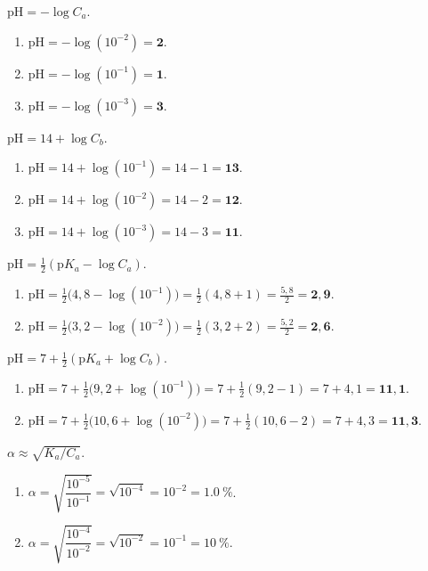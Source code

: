 \documentclass[11pt,a4paper]{article}
\begin{document}

\begin{corrige}
$\mathrm{pH} = -\log C_a$.
\begin{enumerate}[label=\alph*)]
  \item $\mathrm{pH} = -\log(10^{-2}) = \mathbf{2}$.
  \item $\mathrm{pH} = -\log(10^{-1}) = \mathbf{1}$.
  \item $\mathrm{pH} = -\log(10^{-3}) = \mathbf{3}$.
\end{enumerate}
\end{corrige}

\begin{corrige}
$\mathrm{pH} = 14 + \log C_b$.
\begin{enumerate}[label=\alph*)]
  \item $\mathrm{pH} = 14 + \log(10^{-1}) = 14 - 1 = \mathbf{13}$.
  \item $\mathrm{pH} = 14 + \log(10^{-2}) = 14 - 2 = \mathbf{12}$.
  \item $\mathrm{pH} = 14 + \log(10^{-3}) = 14 - 3 = \mathbf{11}$.
\end{enumerate}
\end{corrige}

\begin{corrige}
$\mathrm{pH} = \tfrac12(\mathrm{p}K_a - \log C_a)$.
\begin{enumerate}[label=\alph*)]
  \item $\mathrm{pH} = \tfrac12\bigl(4{,}8 - \log(10^{-1})\bigr) = \tfrac12(4{,}8 + 1) = \tfrac{5{,}8}{2} = \mathbf{2{,}9}$.
  \item $\mathrm{pH} = \tfrac12\bigl(3{,}2 - \log(10^{-2})\bigr) = \tfrac12(3{,}2 + 2) = \tfrac{5{,}2}{2} = \mathbf{2{,}6}$.
\end{enumerate}
\end{corrige}

\begin{corrige}
$\mathrm{pH} = 7 + \tfrac12(\mathrm{p}K_a + \log C_b)$.
\begin{enumerate}[label=\alph*)]
  \item $\mathrm{pH} = 7 + \tfrac12\bigl(9{,}2 + \log(10^{-1})\bigr) = 7 + \tfrac12(9{,}2 - 1) = 7 + 4{,}1 = \mathbf{11{,}1}$.
  \item $\mathrm{pH} = 7 + \tfrac12\bigl(10{,}6 + \log(10^{-2})\bigr) = 7 + \tfrac12(10{,}6 - 2) = 7 + 4{,}3 = \mathbf{11{,}3}$.
\end{enumerate}
\end{corrige}

\begin{corrige}
$\alpha \approx \sqrt{K_a/C_a}$.
\begin{enumerate}[label=\alph*)]
  \item $\alpha = \sqrt{\dfrac{10^{-5}}{10^{-1}}} = \sqrt{10^{-4}} = 10^{-2} = \qty{1,0}{\percent}$.
  \item $\alpha = \sqrt{\dfrac{10^{-4}}{10^{-2}}} = \sqrt{10^{-2}} = 10^{-1} = \qty{10}{\percent}$.
\end{enumerate}
\end{corrige}
\end{document}
